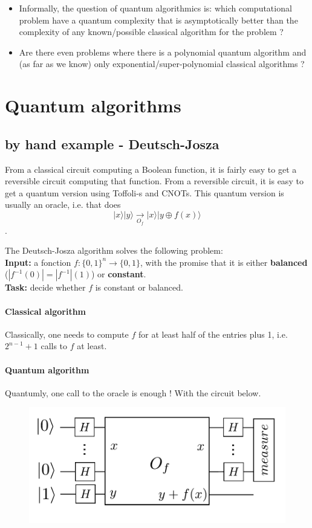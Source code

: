 \documentclass{article}
\begin{document}
\begin{itemize}
\item Informally, the question of quantum algorithmics is: which computational problem
have a quantum complexity that is asymptotically better than the complexity
of any known/possible classical algorithm for the problem ?
\item Are there even problems where there is a polynomial quantum algorithm and (as far as we
know) only exponential/super-polynomial classical algorithms ?
\end{itemize}

\section{Quantum algorithms}

\subsection{by hand example - Deutsch-Josza}

From a classical circuit computing a Boolean function, it is fairly easy to get a reversible 
circuit computing that function. From a reversible circuit, it is easy to get a quantum 
version using Toffoli-s and CNOTs. This quantum version is usually an oracle, i.e. that does
$$|x\rangle|y\rangle\xrightarrow[O_f]{}|x\rangle|y\oplus f(x)\rangle$$.

The Deutsch-Josza algorithm solves the following problem:\\
\textbf{Input:} a fonction $f:\{0,1\}^{n}\rightarrow \{0,1\}$,
with the promise that it is either \textbf{balanced} ($|f^{-1}(0)|=|f^{-1}|(1)$) or
\textbf{constant}.\\
\textbf{Task:} decide whether $f$ is constant or balanced.

\paragraph{Classical algorithm} Classically, one needs to compute $f$ for at least
half of the entries plus 1, i.e. $2^{n-1}+1$ calls to $f$ at least.

\paragraph{Quantum algorithm} Quantumly, one call to the oracle is enough ! With
the circuit below.

\begin{center}
\begin{figure}
\includegraphics[width=.6\textwidth]{deutsch_josza.pdf}
\end{figure}
\end{center}
\end{document}
